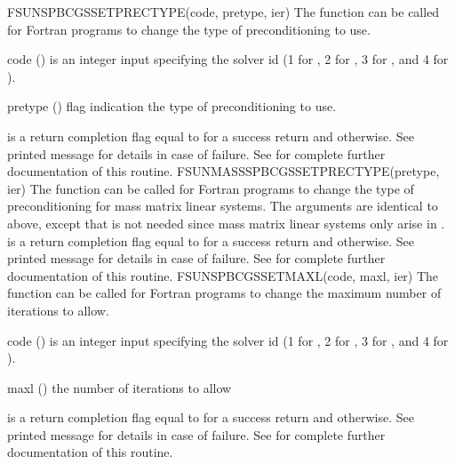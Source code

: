 {
  FSUNSPBCGSSETPRECTYPE(code, pretype, ier)
}
{
  The function  can be called for Fortran
  programs to change the type of preconditioning to use.
}
{
  \begin{args}[pretype]
  \item[code] ()
    is an integer input specifying the solver id (1 for {\cvode}, 2
    for {\ida}, 3 for {\kinsol}, and 4 for {\arkode}).
  \item[pretype] ()
    flag indication the type of preconditioning to use.
  \end{args}
}
{
   is a  return completion flag equal to  for a success
  return and  otherwise. See printed message for details in case
  of failure.
}
{
  See  for complete further documentation of
  this routine.
}
{
  FSUNMASSSPBCGSSETPRECTYPE(pretype, ier)
}
{
  The function  can be called for Fortran
  programs to change the type of preconditioning for mass matrix
  linear systems.
}
{
  The arguments are identical to  above,
  except that  is not needed since mass matrix linear systems
  only arise in {\arkode}.
}
{
   is a  return completion flag equal to  for a success
  return and  otherwise. See printed message for details in case
  of failure.
}
{
  See  for complete further documentation of
  this routine.
}
{
  FSUNSPBCGSSETMAXL(code, maxl, ier)
}
{
  The function  can be called for Fortran
  programs to change the maximum number of iterations to allow.
}
{
  \begin{args}[maxl]
  \item[code] ()
    is an integer input specifying the solver id (1 for {\cvode}, 2
    for {\ida}, 3 for {\kinsol}, and 4 for {\arkode}).
  \item[maxl] ()
    the number of iterations to allow
  \end{args}
}
{
   is a  return completion flag equal to  for a success
  return and  otherwise. See printed message for details in case
  of failure.
}
{
  See  for complete further documentation of
  this routine.
}
